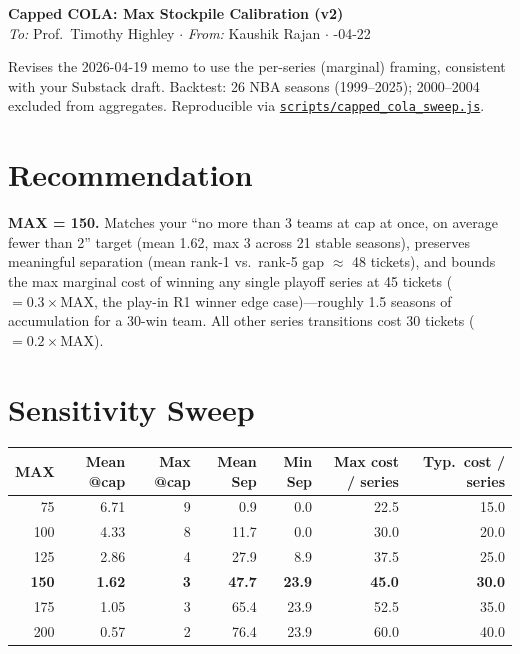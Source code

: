 \documentclass[10pt,letterpaper]{article}
\begin{document}
\begin{center}
{\LARGE\textbf{Capped COLA: Max Stockpile Calibration (v2)}}\\[0.2em]
{\small \textit{To:} Prof.\ Timothy Highley \quad $\cdot$ \quad \textit{From:} Kaushik Rajan \quad $\cdot$ -04-22}
\end{center}

{\small Revises the 2026-04-19 memo to use the per-series (marginal) framing, consistent with your Substack draft. Backtest: 26 NBA seasons (1999--2025); 2000--2004 excluded from aggregates. Reproducible via \href{../scripts/capped_cola_sweep.js}{\texttt{scripts/capped\_cola\_sweep.js}}.}

\section*{Recommendation}

\textbf{MAX = 150.} Matches your ``no more than 3 teams at cap at once, on average fewer than 2'' target (mean 1.62, max 3 across 21 stable seasons), preserves meaningful separation (mean rank-1 vs.\ rank-5 gap $\approx$ 48 tickets), and bounds the max marginal cost of winning any single playoff series at 45 tickets ($= 0.3 \times \text{MAX}$, the play-in R1 winner edge case)---roughly 1.5 seasons of accumulation for a 30-win team. All other series transitions cost 30 tickets ($= 0.2 \times \text{MAX}$).

\section*{Sensitivity Sweep}

\begin{center}
\begin{tabular}{r|rr|rr|rr}
\toprule
\textbf{MAX} & \textbf{Mean @cap} & \textbf{Max @cap} & \textbf{Mean Sep} & \textbf{Min Sep} & \textbf{Max cost / series} & \textbf{Typ.\ cost / series} \\
\midrule
 75 & 6.71 & 9 &  0.9 &  0.0 & 22.5 & 15.0 \\
100 & 4.33 & 8 & 11.7 &  0.0 & 30.0 & 20.0 \\
125 & 2.86 & 4 & 27.9 &  8.9 & 37.5 & 25.0 \\
\rowcolor{yellow!18}
\textbf{150} & \textbf{1.62} & \textbf{3} & \textbf{47.7} & \textbf{23.9} & \textbf{45.0} & \textbf{30.0} \\
175 & 1.05 & 3 & 65.4 & 23.9 & 52.5 & 35.0 \\
200 & 0.57 & 2 & 76.4 & 23.9 & 60.0 & 40.0 \\
\bottomrule
\end{tabular}
\end{center}
\end{document}
